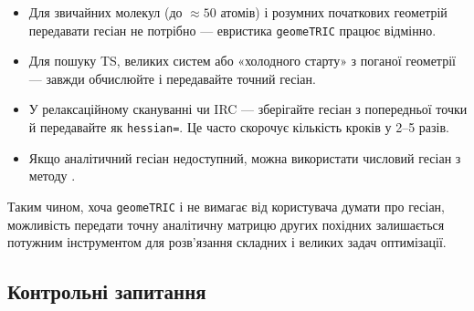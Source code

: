\begin{itemize}
    \item Для звичайних молекул (до $\approx 50$ атомів) і розумних початкових геометрій передавати гесіан не потрібно --- евристика \texttt{geomeTRIC} працює відмінно.
    \item Для пошуку TS, великих систем або «холодного старту» з поганої геометрії --- завжди обчислюйте і передавайте точний гесіан.
    \item У релаксаційному скануванні чи IRC --- зберігайте гесіан з попередньої точки й передавайте як \texttt{hessian=}. Це часто скорочує кількість кроків у 2–5 разів.
    \item Якщо аналітичний гесіан недоступний, можна використати числовий гесіан з методу .
\end{itemize}

Таким чином, хоча \texttt{geomeTRIC} і не вимагає від користувача думати про гесіан, можливість передати точну аналітичну матрицю других похідних залишається потужним інструментом для розв’язання складних і великих задач оптимізації.


\subsection*{Контрольні запитання}

